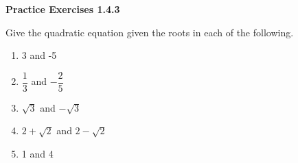 \noindent\textbf{Practice Exercises 1.4.3}

\vspace{0.75ex}

Give the quadratic equation given the roots in each of the following.

\begin{enumerate}[label = \color{blue}\arabic*. ]
   \item 3 and -5
   \item $ \dfrac{1}{3} $ and $ -\dfrac{2}{5} $
   \item $ \sqrt{3} $ and $ -\sqrt{3} $
   \item $ 2 + \sqrt{2} $ and $ 2 - \sqrt{2} $
   \item 1 and 4
\end{enumerate}
